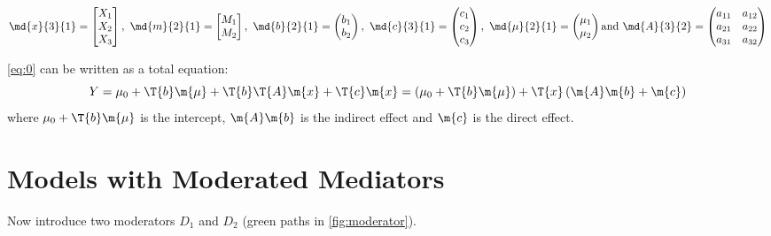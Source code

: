 \begin{equation*}\label{eq:0}
    \md{x}{3}{1} =
        \begin{bmatrix}
            X_1\\
            X_2\\
            X_3
        \end{bmatrix},\ 
    \md{m}{2}{1} =
        \begin{bmatrix}
            M_1\\
            M_2
        \end{bmatrix},\ 
    \md{b}{2}{1} =
        \begin{pmatrix}
            b_1\\
            b_2
        \end{pmatrix},\ 
    \md{c}{3}{1} =
        \begin{pmatrix}
            c_1\\
            c_2\\
            c_3
        \end{pmatrix},\ 
    \md{\mu}{2}{1} =
        \begin{pmatrix}
            \mu_1\\
            \mu_2
        \end{pmatrix}\text{and}\ 
    \md{A}{3}{2} =
        \begin{pmatrix}
            a_{11}    &a_{12}\\
            a_{21}    &a_{22}\\
            a_{31}    &a_{32}
        \end{pmatrix}
\end{equation*}

\cref{eq:0} can be written as a total equation:
\begin{equation}\label{eq:tot0}
    Y = \mu_0 + \T{b}\m{\mu} + \T{b}\T{A}\m{x} + \T{c}\m{x} = \left( \mu_0 + \T{b}\m{\mu} \right) + \T{x} \left( \m{A}\m{b} + \m{c} \right)
\end{equation}
where $\mu_0 + \T{b}\m{\mu}$ is the intercept, $\m{A}\m{b}$ is the indirect effect and $\m{c}$ is the direct effect.

\section{Models with Moderated Mediators}

Now introduce two moderators $D_1$ and $D_2$ (green paths in \cref{fig:moderator}).

